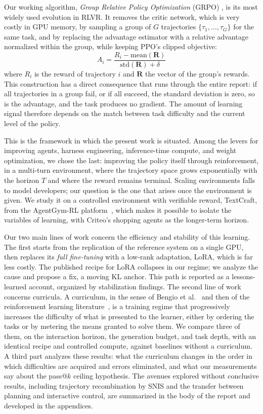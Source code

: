 \documentclass[11pt,a4paper]{article}
\begin{document}
Our working algorithm, \emph{Group Relative Policy Optimization} (GRPO) \cite{shao2024deepseekmath}, is its most widely used evolution in RLVR. It removes the critic network, which is very costly in GPU memory, by sampling a group of $G$ trajectories $\{\tau_1, \dots, \tau_G\}$ for the same task, and by replacing the advantage estimator with a relative advantage normalized within the group, while keeping PPO's clipped objective:
\begin{equation}
\hat{A}_i = \frac{R_i - \text{mean}(\mathbf{R})}{\text{std}(\mathbf{R}) + \delta}
\end{equation}
where $R_i$ is the reward of trajectory $i$ and $\mathbf{R}$ the vector of the group's rewards. This construction has a direct consequence that runs through the entire report: if all trajectories in a group fail, or if all succeed, the standard deviation is zero, so is the advantage, and the task produces no gradient. The amount of learning signal therefore depends on the match between task difficulty and the current level of the policy.

This is the framework in which the present work is situated. Among the levers for improving agents, harness engineering, inference-time compute, and weight optimization, we chose the last: improving the policy itself through reinforcement, in a multi-turn environment, where the trajectory space grows exponentially with the horizon $T$ and where the reward remains terminal. Scaling environments falls to model developers; our question is the one that arises once the environment is given. We study it on a controlled environment with verifiable reward, TextCraft, from the AgentGym-RL platform~\cite{xi_agentgym-rl_2025}, which makes it possible to isolate the variables of learning, with Criteo's shopping agents as the longer-term horizon.

Our two main lines of work concern the efficiency and stability of this learning. The first starts from the replication of the reference system on a single GPU, then replaces its \emph{full fine-tuning} with a low-rank adaptation, LoRA, which is far less costly. The published recipe for LoRA collapses in our regime; we analyze the cause and propose a fix, a moving KL anchor. This path is reported as a lessons-learned account, organized by stabilization findings. The second line of work concerns curricula. A curriculum, in the sense of Bengio et al.~\cite{bengio2009curriculum} and then of the reinforcement learning literature~\cite{narvekar2020curriculum}, is a training regime that progressively increases the difficulty of what is presented to the learner, either by ordering the tasks or by metering the means granted to solve them. We compare three of them, on the interaction horizon, the generation budget, and task depth, with an identical recipe and controlled compute, against baselines without a curriculum. A third part analyzes these results: what the curriculum changes in the order in which difficulties are acquired and errors eliminated, and what our measurements say about the pass@$k$ ceiling hypothesis. The avenues explored without conclusive results, including trajectory recombination by SNIS and the transfer between planning and interactive control, are summarized in the body of the report and developed in the appendices.
\end{document}
